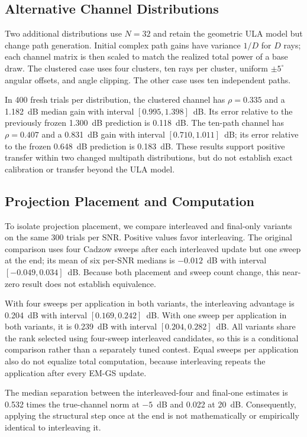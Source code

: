 \documentclass[journal]{IEEEtran}
\begin{document}
\subsection{Alternative Channel Distributions}

Two additional distributions use $N=32$ and retain the geometric ULA model
but change path generation. Initial complex path gains have variance $1/D$ for $D$
rays; each channel matrix is then scaled to match the realized total power
of a base draw. The clustered case uses four clusters, ten rays per cluster,
uniform $\pm5^\circ$ angular offsets, and angle clipping. The other case
uses ten independent paths.

In 400 fresh trials per distribution, the clustered channel has
$\rho=0.335$ and a 1.182~dB median gain with interval
$[0.995,1.398]$~dB. Its error relative to the previously frozen
1.300~dB prediction is 0.118~dB. The ten-path channel has $\rho=0.407$
and a 0.831~dB gain with interval $[0.710,1.011]$~dB; its error relative
to the frozen 0.648~dB prediction is 0.183~dB. These results support
positive transfer within two changed multipath distributions, but do not
establish exact calibration or transfer beyond the ULA model.

\subsection{Projection Placement and Computation}
\label{sec:placement}

To isolate projection placement, we compare interleaved and final-only
variants on the same 300 trials per SNR. Positive values favor interleaving.
The original comparison uses
four Cadzow sweeps after each interleaved update but one sweep at the end;
its mean of six per-SNR medians is $-0.012$~dB with interval
$[-0.049,0.034]$~dB. Because both placement and sweep count change, this
near-zero result does not establish equivalence.

With four sweeps per application in both variants, the interleaving
advantage is 0.204~dB with interval $[0.169,0.242]$~dB. With one sweep
per application in both variants, it is 0.239~dB with interval
$[0.204,0.282]$~dB. All variants share the rank selected using four-sweep
interleaved candidates, so this is a conditional comparison rather than a
separately tuned contest. Equal sweeps per application also do not equalize
total computation, because interleaving repeats the application after every
EM-GS update.

The median separation between the interleaved-four and final-one estimates
is 0.532 times the true-channel norm at $-5$~dB and 0.022 at 20~dB.
Consequently, applying the structural step once at the end is not
mathematically or empirically identical to interleaving it.
\end{document}
